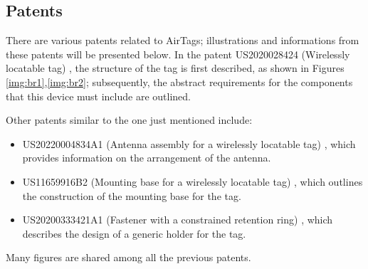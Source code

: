 \documentclass[english]{article}
\begin{document}
\subsection{Patents} 
There are various patents related to AirTags; illustrations and informations from these patents will be presented below. In the patent US2020028424 (Wirelessly locatable tag) \cite{Perkins_Sano_Walton_Wang_Werner_Ashcroft_De_Hunter_Kim_Crosby_Jung_Schaevitz_Avendal_Da_Di_Nath_Papantonis_Graham_Thompson_Copeland_Ely_2022}, the structure of the tag is first described, as shown in Figures \ref{img:br1},\ref{img:br2}; subsequently, the abstract requirements for the components that this device must include are outlined. 

Other patents similar to the one just mentioned include:
\begin{itemize}
\item US20220004834A1 (Antenna assembly for a wirelessly locatable tag) \cite{Perkins_Avendal_Da_Di_Nath_Papantonis_Schaevitz_Werner_2022}, which provides information on the arrangement of the antenna.
\item US11659916B2 (Mounting base for a wirelessly locatable tag) \cite{Perkins_Thompson_2023}, which outlines the construction of the mounting base for the tag.
\item US20200333421A1 (Fastener with a constrained retention ring) \cite{Perkins_De_Hunter_2020}, which describes the design of a generic holder for the tag.
\end{itemize}
Many figures are shared among all the previous patents.
\end{document}
